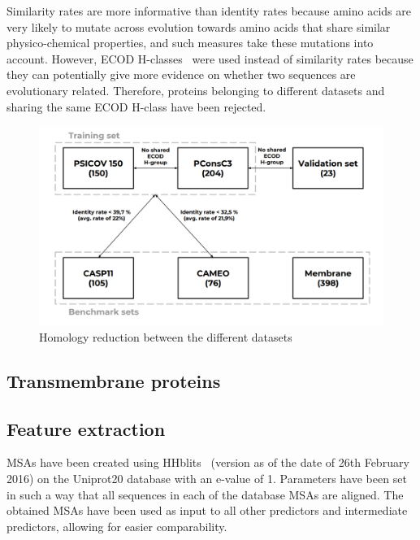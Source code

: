     Similarity rates are more informative than identity rates because amino acids
    are very likely to mutate across evolution towards amino acids that share
    similar physico-chemical properties, and such measures take these mutations
    into account. However, ECOD H-classes~\cite{10.1371/journal.pcbi.1003926}
    were used instead of similarity rates because they can potentially give more
    evidence on whether two sequences are evolutionary related.
    Therefore, proteins belonging to different datasets and sharing the same
    ECOD H-class have been rejected.


    \begin{figure}[H]
      \begin{center}
        \includegraphics[width=\textwidth, keepaspectratio]{imgs/datasets.png}
         \caption{Homology reduction between the different datasets}
        \label{homology_reduction}
      \end{center}
    \end{figure}

  \subsection{Transmembrane proteins}

    \todo{}

  \subsection{Feature extraction}

    MSAs have been created using HHblits~\cite{HHblits} (version as of the date of 26th February 2016) on the Uniprot20 database
    with an e-value of 1. Parameters have been set in such a way that all sequences in each of the database MSAs are aligned.
    The obtained MSAs have been used as input to all other predictors and intermediate predictors, allowing for easier comparability.

